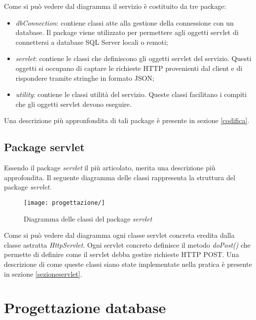 Come si può vedere dal diagramma il servizio è costituito da tre package:
\begin{itemize}
	\item \textit{dbConnection}: contiene classi atte alla gestione della connessione con un database. Il package viene utilizzato per permettere agli oggetti servlet di connettersi a database SQL Server locali o remoti;
	\item \textit{servlet}: contiene le classi che definiscono gli oggetti servlet del servizio. Questi oggetti si occupano di captare le richieste HTTP provenienti dal client e di rispondere tramite stringhe in formato JSON;
	\item \textit{utility}: contiene le classi utilità del servizio. Queste classi facilitano i compiti che gli oggetti servlet devono eseguire.
\end{itemize}
Una descrizione più appronfondita di tali package è presente in sezione \ref{codifica}.

\subsection{Package servlet}

Essendo il package \textit{servlet} il più articolato, merita una descrizione più approfondita. Il seguente diagramma delle classi rappresenta la struttura del package \textit{servlet}.

\begin{figure}[!h] 
    \centering 
    \texttt{[image: progettazione/]} 
    \caption{Diagramma delle classi del package \textit{servlet}}
\end{figure}

Come si può vedere dal diagramma ogni classe servlet concreta eredita dalla classe astratta \textit{HttpServlet}. Ogni servlet concreto definisce il metodo \textit{doPost()} che permette di definire come il servlet debba gestire richieste HTTP POST. Una descrizione di come queste classi siano state implementate nella pratica è presente in sezione \ref{sezioneservlet}.

\section{Progettazione database}

